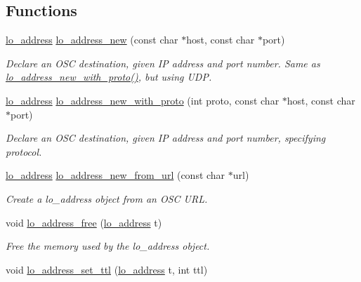 \subsection*{Functions}
\begin{DoxyCompactItemize}
\item 
\hyperlink{lo__types_8h_abf9b53223467de596b89e1377b0f3f3d}{lo\+\_\+address} \hyperlink{group__liblo_gae5af61a02ab08871d3ea070c8f770cfe}{lo\+\_\+address\+\_\+new} (const char $\ast$host, const char $\ast$port)
\begin{DoxyCompactList}\small\item\em Declare an O\+S\+C destination, given I\+P address and port number. Same as \hyperlink{group__liblo_gaceb4b068bc48c2b075e790910cab3075}{lo\+\_\+address\+\_\+new\+\_\+with\+\_\+proto()}, but using U\+D\+P. \end{DoxyCompactList}\item 
\hyperlink{lo__types_8h_abf9b53223467de596b89e1377b0f3f3d}{lo\+\_\+address} \hyperlink{group__liblo_gaceb4b068bc48c2b075e790910cab3075}{lo\+\_\+address\+\_\+new\+\_\+with\+\_\+proto} (int proto, const char $\ast$host, const char $\ast$port)
\begin{DoxyCompactList}\small\item\em Declare an O\+S\+C destination, given I\+P address and port number, specifying protocol. \end{DoxyCompactList}\item 
\hyperlink{lo__types_8h_abf9b53223467de596b89e1377b0f3f3d}{lo\+\_\+address} \hyperlink{group__liblo_ga1af2cb3c80393cba838f64dfcdc35620}{lo\+\_\+address\+\_\+new\+\_\+from\+\_\+url} (const char $\ast$url)
\begin{DoxyCompactList}\small\item\em Create a lo\+\_\+address object from an O\+S\+C U\+R\+L. \end{DoxyCompactList}\item 
void \hyperlink{group__liblo_ga82b9a2d1d30214114eb5298f43aebac5}{lo\+\_\+address\+\_\+free} (\hyperlink{lo__types_8h_abf9b53223467de596b89e1377b0f3f3d}{lo\+\_\+address} t)
\begin{DoxyCompactList}\small\item\em Free the memory used by the lo\+\_\+address object. \end{DoxyCompactList}\item 
void \hyperlink{group__liblo_gacd72097b92411db148844d89071fd281}{lo\+\_\+address\+\_\+set\+\_\+ttl} (\hyperlink{lo__types_8h_abf9b53223467de596b89e1377b0f3f3d}{lo\+\_\+address} t, int ttl)

\end{DoxyCompactItemize}
